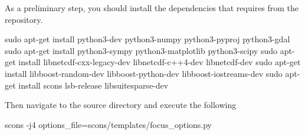
\noindent As a preliminary step, you should install the dependencies that \esfinley requires from the repository.
\begin{shellCode}
sudo apt-get install python3-dev python3-numpy python3-pyproj python3-gdal
sudo apt-get install python3-sympy python3-matplotlib python3-scipy
sudo apt-get install libnetcdf-cxx-legacy-dev libnetcdf-c++4-dev libnetcdf-dev
sudo apt-get install libboost-random-dev libboost-python-dev libboost-iostreams-dev
sudo apt-get install scons lsb-release libsuitesparse-dev
\end{shellCode}



\noindent Then navigate to the source directory and execute the following 
\begin{shellCode}
scons -j4 options_file=scons/templates/focus_options.py
\end{shellCode}


